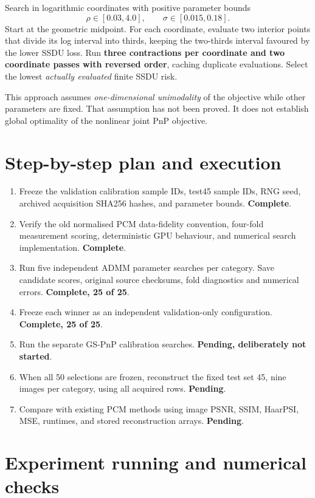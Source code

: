 \documentclass[10pt,a4paper]{article}
\begin{document}
Search in logarithmic coordinates with positive parameter bounds
\[
\rho\in[0.03,4.0],\qquad \sigma\in[0.015,0.18].
\]
Start at the geometric midpoint. For each coordinate, evaluate two
interior points that divide its log interval into thirds, keeping the
two-thirds interval favoured by the lower SSDU loss.
Run \textbf{three contractions per coordinate and two coordinate
passes with reversed order}, caching duplicate evaluations.
Select the lowest \emph{actually evaluated} finite SSDU risk.

This approach assumes \emph{one-dimensional unimodality} of the
objective while other parameters are fixed. That assumption has
not been proved. It does not establish global optimality of
the nonlinear joint PnP objective.

\section{Step-by-step plan and execution}

\begin{enumerate}[leftmargin=1.5em]
\item Freeze the validation calibration sample IDs, test45 sample IDs,
RNG seed, archived acquisition SHA256 hashes, and parameter bounds.
\textbf{Complete}.
\item Verify the old normalised PCM data-fidelity convention,
four-fold measurement scoring, deterministic GPU behaviour, and
numerical search implementation. \textbf{Complete}.
\item Run five independent ADMM parameter searches per category.
Save candidate scores, original source checksums, fold diagnostics
and numerical errors. \textbf{Complete, 25 of 25}.
\item Freeze each winner as an independent validation-only
configuration. \textbf{Complete, 25 of 25}.
\item Run the separate GS-PnP calibration searches. \textbf{Pending,
deliberately not started}.
\item When all 50 selections are frozen, reconstruct the fixed
test set 45, nine images per category, using all acquired rows.
\textbf{Pending}.
\item Compare with existing PCM methods using image
PSNR, SSIM, HaarPSI, MSE, runtimes, and stored reconstruction
arrays. \textbf{Pending}.
\end{enumerate}

\section{Experiment running and numerical checks}
\end{document}
